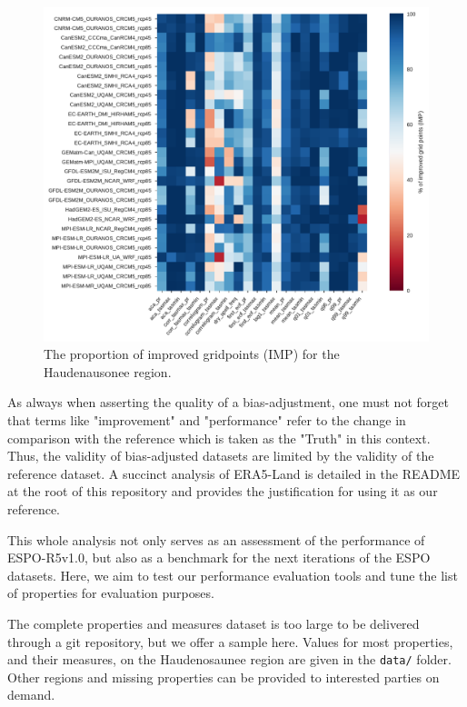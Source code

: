\documentclass[letterpaper,10pt]{article}
\begin{document}
\begin{figure}
    \centering
    \includegraphics[width=\textwidth]{../images/overall_improvement.pdf}
    \caption{The proportion of improved gridpoints (IMP) for the Haudenausonee region.}\label{fig:imp}
\end{figure}

As always when asserting the quality of a bias-adjustment, one must not forget that terms like "improvement" and "performance" refer to the change in comparison with the reference which is taken as the "Truth" in this context.
Thus, the validity of bias-adjusted datasets are limited by the validity of the reference dataset.
A succinct analysis of ERA5-Land is detailed in the README at the root of this repository and provides the justification for using it as our reference.

This whole analysis not only serves as an assessment of the performance of ESPO-R5v1.0, but also as a benchmark for the next iterations of the ESPO datasets.
Here, we aim to test our performance evaluation tools and tune the list of properties for evaluation purposes.

The complete properties and measures dataset is too large to be delivered through a git repository, but we offer a sample here.
Values for most properties, and their measures, on the Haudenosaunee region are given in the \texttt{data/} folder.
Other regions and missing properties can be provided to interested parties on demand.
\end{document}

